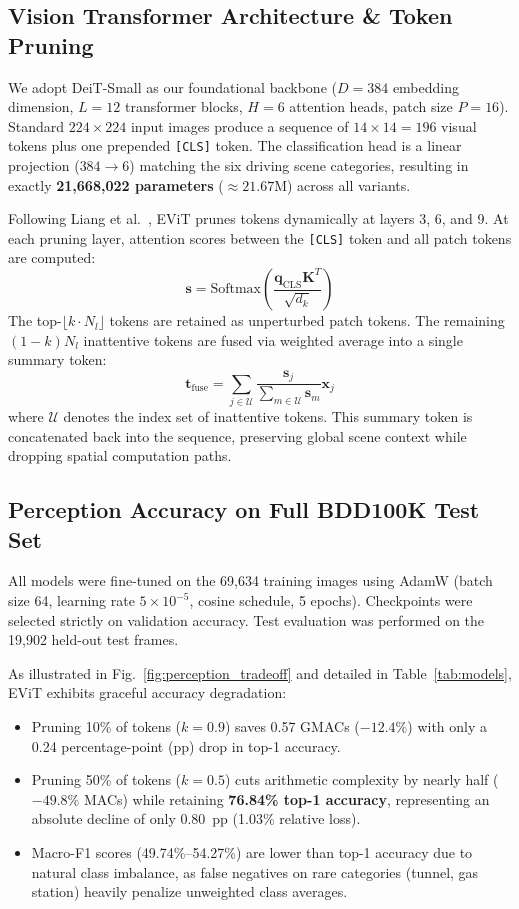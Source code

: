 \documentclass[conference]{IEEEtran}
\begin{document}
\subsection{Vision Transformer Architecture \& Token Pruning}
We adopt DeiT-Small \cite{touvron2021training} as our foundational backbone ($D = 384$ embedding dimension, $L = 12$ transformer blocks, $H = 6$ attention heads, patch size $P = 16$). Standard $224 \times 224$ input images produce a sequence of $14 \times 14 = 196$ visual tokens plus one prepended \texttt{[CLS]} token. The classification head is a linear projection ($384 \to 6$) matching the six driving scene categories, resulting in exactly \textbf{21,668,022 parameters} ($\approx 21.67$M) across all variants.

Following Liang et al.\ \cite{liang2022not}, EViT prunes tokens dynamically at layers 3, 6, and 9. At each pruning layer, attention scores between the \texttt{[CLS]} token and all patch tokens are computed:
\begin{equation}
\mathbf{s} = \text{Softmax}\left(\frac{\mathbf{q}_{\text{CLS}} \mathbf{K}^T}{\sqrt{d_k}}\right)
\end{equation}
The top-$\lfloor k \cdot N_l \rfloor$ tokens are retained as unperturbed patch tokens. The remaining $(1-k)N_l$ inattentive tokens are fused via weighted average into a single summary token:
\begin{equation}
\mathbf{t}_{\text{fuse}} = \sum_{j \in \mathcal{U}} \frac{\mathbf{s}_j}{\sum_{m \in \mathcal{U}} \mathbf{s}_m} \mathbf{x}_j
\end{equation}
where $\mathcal{U}$ denotes the index set of inattentive tokens. This summary token is concatenated back into the sequence, preserving global scene context while dropping spatial computation paths.

\subsection{Perception Accuracy on Full BDD100K Test Set}
All models were fine-tuned on the 69,634 training images using AdamW (batch size 64, learning rate $5 \times 10^{-5}$, cosine schedule, 5 epochs). Checkpoints were selected strictly on validation accuracy. Test evaluation was performed on the 19,902 held-out test frames.

As illustrated in Fig.~\ref{fig:perception_tradeoff} and detailed in Table~\ref{tab:models}, EViT exhibits graceful accuracy degradation:
\begin{itemize}
    \item Pruning 10\% of tokens ($k=0.9$) saves 0.57 GMACs ($-12.4\%$) with only a 0.24 percentage-point (pp) drop in top-1 accuracy.
    \item Pruning 50\% of tokens ($k=0.5$) cuts arithmetic complexity by nearly half ($-49.8\%$ MACs) while retaining \textbf{76.84\% top-1 accuracy}, representing an absolute decline of only 0.80~pp (1.03\% relative loss).
    \item Macro-F1 scores (49.74\%--54.27\%) are lower than top-1 accuracy due to natural class imbalance, as false negatives on rare categories (tunnel, gas station) heavily penalize unweighted class averages.
\end{itemize}
\end{document}
